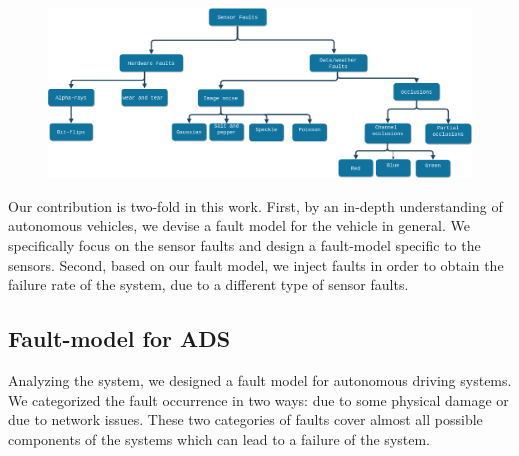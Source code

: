 
 \begin{figure}
 	\centering
 	\includegraphics[width=0.8\linewidth]{finalFM}
 	\caption[Fault model for camera]{}
 	\label{fig:finalfm}
 \end{figure}
 


Our contribution is two-fold in this work. First, by an in-depth understanding of autonomous vehicles, we devise a fault model for the vehicle in general. We specifically focus on the sensor faults and design a fault-model specific to the sensors. Second, based on our fault model, we inject faults in order to obtain the failure rate of the system, due to a different type of sensor faults.

\subsection{Fault-model for ADS}
Analyzing the system, we designed a fault model for autonomous driving systems. We categorized the fault occurrence in two ways: due to some physical damage or due to network issues. These two categories of faults cover almost all possible components of the systems which can lead to a failure of the system. 

